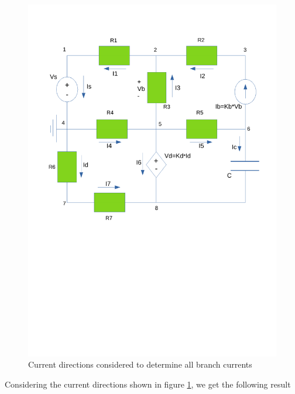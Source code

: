 \begin{figure}[h!] \centering
\includegraphics[width=0.6\linewidth]{Esquema1_currents_teo.pdf}
\caption{Current directions considered to determine all branch currents}
\label{fig:Esquema1_currents_teo}
\end{figure}

\par Considering the current directions shown in figure \ref{fig:Esquema1_currents_teo}, we get the following result

\begin{table}[h!]
\centering
\begin{tabularx}{0.6\textwidth} {
  | >{\raggedright\arraybackslash}X
  | >{\raggedleft\arraybackslash}X | }
 \hline
 
\end{tabularx}
\end{table}


	


